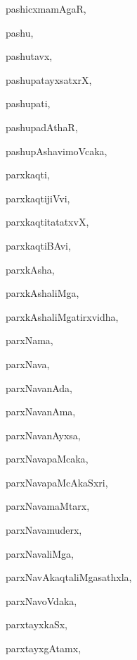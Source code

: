 \begin{multicols}{3}
{\noindent
{pashicxmamAgaR}, \pageref{pashicxmamAgaR}

\noindent
{pashu}, \pageref{pashu}

\noindent
{pashutavx}, \pageref{pashutavx}

\noindent
{pashupatayxsatxrX}, \pageref{pashupatayxsatxrX}

\noindent
{pashupati}, \pageref{pashupati}

\noindent
{pashupadAthaR}, \pageref{pashupadAthaR}

\noindent
{pashupAshavimoVcaka}, \pageref{pashupAshavimoVcaka}

\noindent
{parxkaqti}, \pageref{parxkaqti}

\noindent
{parxkaqtijiVvi}, \pageref{parxkaqtijiVvi}

\noindent
{parxkaqtitatatxvX}, \pageref{parxkaqtitatatxvX}

\noindent
{parxkaqtiBAvi}, \pageref{parxkaqtiBAvi}

\noindent
{parxkAsha}, \pageref{parxkAsha}

\noindent
{parxkAshaliMga}, \pageref{parxkAshaliMga}

\noindent
{parxkAshaliMgatirxvidha}, \pageref{parxkAshaliMgatirxvidha}

\noindent
{parxNama}, \pageref{parxNama}

\noindent
{parxNava}, \pageref{parxNava}

\noindent
{parxNavanAda}, \pageref{parxNavanAda}

\noindent
{parxNavanAma}, \pageref{parxNavanAma}

\noindent
{parxNavanAyxsa}, \pageref{parxNavanAyxsa}

\noindent
{parxNavapaMcaka}, \pageref{parxNavapaMcaka}

\noindent
{parxNavapaMcAkaSxri}, \pageref{parxNavapaMcAkaSxri}

\noindent
{parxNavamaMtarx}, \pageref{parxNavamaMtarx}

\noindent
{parxNavamuderx}, \pageref{parxNavamuderx}

\noindent
{parxNavaliMga}, \pageref{parxNavaliMga}

\noindent
{parxNavAkaqtaliMgasathxla}, \pageref{parxNavAkaqtaliMgasathxla}

\noindent
{parxNavoVdaka}, \pageref{parxNavoVdaka}

\noindent
{parxtayxkaSx}, \pageref{parxtayxkaSx}

\noindent
{parxtayxgAtamx}, \pageref{parxtayxgAtamx}

}
\end{multicols}
